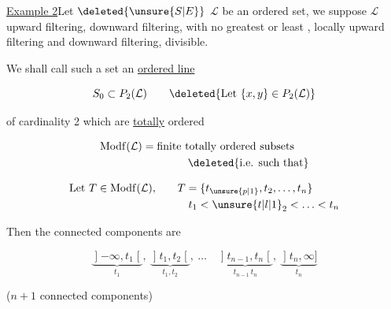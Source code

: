 
\uline{Example 2}\quad Let $\deleted{\unsure{S|E}}$ $\mathcal L$ be an ordered set,
we suppose $\mathcal L$ upward filtering, downward
filtering, with no greatest or
least , locally upward filtering
and downward filtering, divisible.

We shall call such a set an
\uline{ordered line}

\[
S_0\subset P_2(\mathcal L)\qquad
\deleted{\text{Let }\{x,y\}\in P_2(\mathcal L)}
\]

\textquotedbl\quad {}  of cardinality 2  which are \uline{totally} ordered

\[
\begin{aligned}
&\mathrm{Modf}(\mathcal L)=\text{finite totally ordered subsets}\\
&\hspace{8em}\deleted{\text{i.e. such that}}
\end{aligned}
\]

\[
\begin{aligned}
 \text{Let }T\in\mathrm{Modf}(\mathcal L),\qquad &T=\{t_{\unsure{p|1}},t_2,\ldots,t_{n}\}\\
 &\quad t_1<\unsure{t|l|1}_2<\ldots<t_n
\end{aligned}
\]

Then the connected components are

\[
\underbrace{\mathopen{]}-\infty,t_1\mathclose{[}}_{t_1},\
\underbrace{\mathopen{]}t_1,t_2\mathclose{[}}_{t_1,t_2},\
\ldots\quad
\underbrace{\mathopen{]}t_{n-1},t_n\mathclose{[}}_{t_{n-1}\,t_n},\
\underbrace{\mathopen{]}t_n,\infty\mathclose{]}}_{t_n}
\]


($n+1$ connected components)

